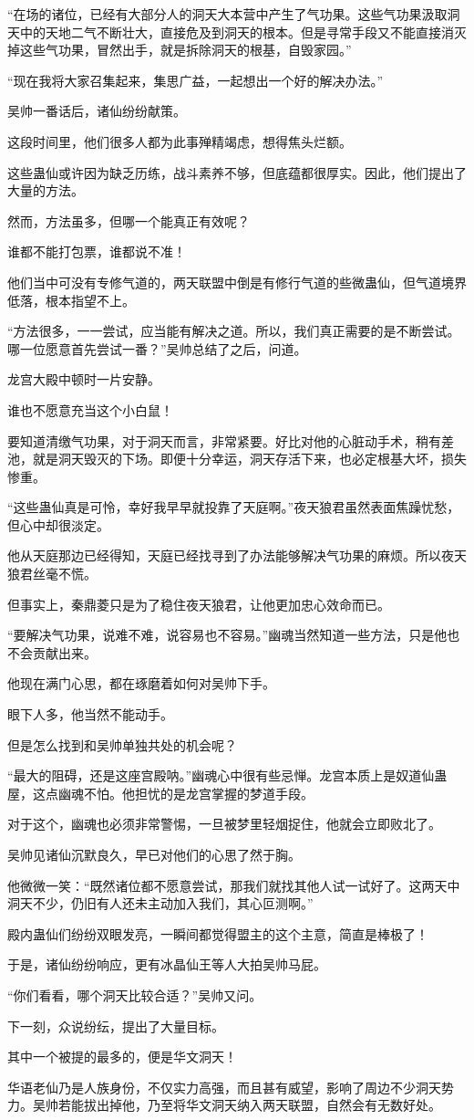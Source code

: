 \begin{this_body}
“在场的诸位，已经有大部分人的洞天大本营中产生了气功果。这些气功果汲取洞天中的天地二气不断壮大，直接危及到洞天的根本。但是寻常手段又不能直接消灭掉这些气功果，冒然出手，就是拆除洞天的根基，自毁家园。”

“现在我将大家召集起来，集思广益，一起想出一个好的解决办法。”

吴帅一番话后，诸仙纷纷献策。

这段时间里，他们很多人都为此事殚精竭虑，想得焦头烂额。

这些蛊仙或许因为缺乏历练，战斗素养不够，但底蕴都很厚实。因此，他们提出了大量的方法。

然而，方法虽多，但哪一个能真正有效呢？

谁都不能打包票，谁都说不准！

他们当中可没有专修气道的，两天联盟中倒是有修行气道的些微蛊仙，但气道境界低落，根本指望不上。

“方法很多，一一尝试，应当能有解决之道。所以，我们真正需要的是不断尝试。哪一位愿意首先尝试一番？”吴帅总结了之后，问道。

龙宫大殿中顿时一片安静。

谁也不愿意充当这个小白鼠！

要知道清缴气功果，对于洞天而言，非常紧要。好比对他的心脏动手术，稍有差池，就是洞天毁灭的下场。即便十分幸运，洞天存活下来，也必定根基大坏，损失惨重。

“这些蛊仙真是可怜，幸好我早早就投靠了天庭啊。”夜天狼君虽然表面焦躁忧愁，但心中却很淡定。

他从天庭那边已经得知，天庭已经找寻到了办法能够解决气功果的麻烦。所以夜天狼君丝毫不慌。

但事实上，秦鼎菱只是为了稳住夜天狼君，让他更加忠心效命而已。

“要解决气功果，说难不难，说容易也不容易。”幽魂当然知道一些方法，只是他也不会贡献出来。

他现在满门心思，都在琢磨着如何对吴帅下手。

眼下人多，他当然不能动手。

但是怎么找到和吴帅单独共处的机会呢？

“最大的阻碍，还是这座宫殿呐。”幽魂心中很有些忌惮。龙宫本质上是奴道仙蛊屋，这点幽魂不怕。他担忧的是龙宫掌握的梦道手段。

对于这个，幽魂也必须非常警惕，一旦被梦里轻烟捉住，他就会立即败北了。

吴帅见诸仙沉默良久，早已对他们的心思了然于胸。

他微微一笑：“既然诸位都不愿意尝试，那我们就找其他人试一试好了。这两天中洞天不少，仍旧有人还未主动加入我们，其心叵测啊。”

殿内蛊仙们纷纷双眼发亮，一瞬间都觉得盟主的这个主意，简直是棒极了！

于是，诸仙纷纷响应，更有冰晶仙王等人大拍吴帅马屁。

“你们看看，哪个洞天比较合适？”吴帅又问。

下一刻，众说纷纭，提出了大量目标。

其中一个被提的最多的，便是华文洞天！

华语老仙乃是人族身份，不仅实力高强，而且甚有威望，影响了周边不少洞天势力。吴帅若能拔出掉他，乃至将华文洞天纳入两天联盟，自然会有无数好处。

\end{this_body}

